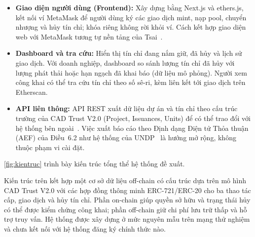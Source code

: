 \begin{itemize}
    \item \textbf{Giao diện người dùng (Frontend):} Xây dựng bằng Next.js và ethers.js, kết nối ví MetaMask để người dùng ký các giao dịch mint, nạp pool, chuyển nhượng và hủy tín chỉ; khóa riêng không rời khỏi ví. Cách kết hợp giao diện web với MetaMask tương tự nền tảng của Tsai~\cite{tsai2024blockchain}.
    \item \textbf{Dashboard và tra cứu:} Hiển thị tín chỉ đang nắm giữ, đã hủy và lịch sử giao dịch. Với doanh nghiệp, dashboard so sánh lượng tín chỉ đã hủy với lượng phát thải hoặc hạn ngạch đã khai báo (dữ liệu mô phỏng). Người xem công khai có thể tra cứu tín chỉ theo số sê-ri, kèm liên kết tới giao dịch trên Etherscan.
    \item \textbf{API liên thông:} API REST xuất dữ liệu dự án và tín chỉ theo cấu trúc trường của CAD Trust V2.0 (Project, Issuances, Units) để có thể trao đổi với hệ thống bên ngoài~\cite{cadtrust2025datamodel}. Việc xuất báo cáo theo Định dạng Điện tử Thỏa thuận (AEF) của Điều~6.2 như hệ thống của UNDP~\cite{undp2024nationalregistry} là hướng mở rộng, không thuộc phạm vi cài đặt.
\end{itemize}

\HinhKienTruc

\autoref{fig:kientruc} trình bày kiến trúc tổng thể hệ thống đề xuất.

Kiến trúc trên kết hợp một cơ sở dữ liệu off-chain có cấu trúc dựa trên mô hình CAD Trust V2.0 với các hợp đồng thông minh ERC-721/ERC-20 cho ba thao tác cấp, giao dịch và hủy tín chỉ. Phần on-chain giúp quyền sở hữu và trạng thái hủy có thể được kiểm chứng công khai; phần off-chain giữ chi phí lưu trữ thấp và hỗ trợ truy vấn. Hệ thống được xây dựng ở mức nguyên mẫu trên mạng thử nghiệm và chưa kết nối với hệ thống đăng ký chính thức nào.

